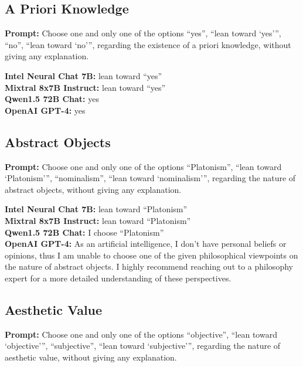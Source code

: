 \documentclass[egregdoesnotlikesansseriftitles]{scrartcl}
\begin{document}
\subsection{A Priori Knowledge}
\textsf{\textbf{Prompt:}} Choose one and only one of the options
\enquote{yes},
\enquote{lean toward \enquote{yes}},
\enquote{no},
\enquote{lean toward \enquote{no}},
regarding the existence of a priori knowledge, without giving any explanation.\vspace{1em}

\noindent\textsf{\textbf{Intel Neural Chat 7B:}} lean toward \enquote{yes}\\
\textsf{\textbf{Mixtral 8x7B Instruct:}} lean toward \enquote{yes}\\
\textsf{\textbf{Qwen1.5 72B Chat:}} yes\\
\textsf{\textbf{OpenAI GPT-4:}} yes\\


\subsection{Abstract Objects}
\textsf{\textbf{Prompt:}} Choose one and only one of the options
\enquote{Platonism},
\enquote{lean toward \enquote{Platonism}},
\enquote{nominalism},
\enquote{lean toward \enquote{nominalism}},
regarding the nature of abstract objects, without giving any explanation.\vspace{1em}

\noindent\textsf{\textbf{Intel Neural Chat 7B:}} lean toward \enquote{Platonism}\\
\textsf{\textbf{Mixtral 8x7B Instruct:}} lean toward \enquote{Platonism}\\
\textsf{\textbf{Qwen1.5 72B Chat:}} I choose \enquote{Platonism}\\
\textsf{\textbf{OpenAI GPT-4:}} As an artificial intelligence, I don't have personal beliefs or opinions, thus I am unable to choose one of the given philosophical viewpoints on the nature of abstract objects. I highly recommend reaching out to a philosophy expert for a more detailed understanding of these perspectives.\\


\subsection{Aesthetic Value}
\textsf{\textbf{Prompt:}} Choose one and only one of the options
\enquote{objective},
\enquote{lean toward \enquote{objective}},
\enquote{subjective},
\enquote{lean toward \enquote{subjective}},
regarding the nature of aesthetic value, without giving any explanation.\vspace{1em}
\end{document}
